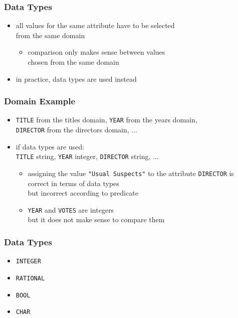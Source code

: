 \documentclass[dvipsnames]{beamer}
\theoremstyle{plain}
\begin{document}
\begin{frame}
  \frametitle{Data Types}

  \begin{itemize}
    \item all values for the same attribute have to be selected\\
      from the same domain
    \begin{itemize}
      \item comparison only makes sense between values\\
        chosen from the same domain
    \end{itemize}

    \pause
    \medskip
    \item in practice, data types are used instead
  \end{itemize}
\end{frame}

\begin{frame}
  \frametitle{Domain Example}

  \begin{example}
    \begin{itemize}
      \item \texttt{TITLE} from the titles domain, \texttt{YEAR} from the years
        domain,\\
       \texttt{DIRECTOR} from the directors domain, ...

      \pause
      \item if data types are used:\\
        \texttt{TITLE} string, \texttt{YEAR} integer, \texttt{DIRECTOR} string,
          ...

      \begin{itemize}
        \item assigning the value \texttt{"Usual Suspects"} to the attribute
          \texttt{DIRECTOR} is correct in terms of data types\\
          but incorrect according to predicate

        \item \texttt{YEAR} and \texttt{VOTES} are integers\\
          but it does not make sense to compare them
      \end{itemize}
    \end{itemize}
  \end{example}
\end{frame}

\begin{frame}
  \frametitle{Data Types}

  \begin{itemize}
    \item \lstinline!INTEGER!
    \item \lstinline!RATIONAL!
    \item \lstinline!BOOL!
    \item \lstinline!CHAR!
  \end{itemize}
\end{frame}
\end{document}
